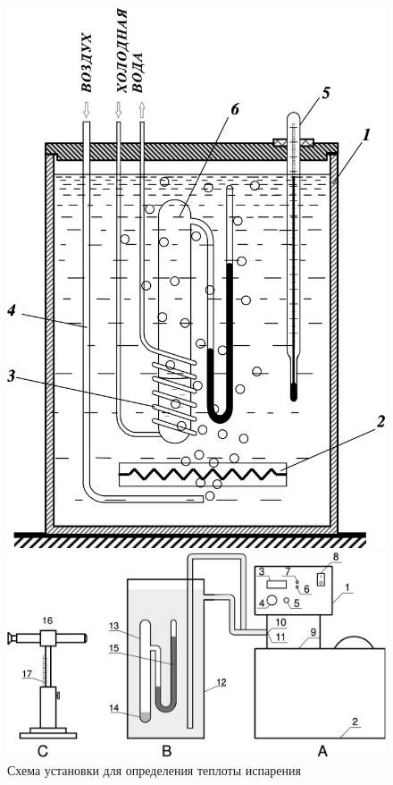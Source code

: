 \documentclass[a4paper, 12pt]{article}
\begin{document}
    \begin{figure}[ht]
        \captionsetup{justification=centering}
        \begin{center}
            \begin{minipage}[ht]{0.29\linewidth}
                \includegraphics[width=1\linewidth]{images/ust1.png}
                \caption{Схема установки для определения теплоты испарения}
                \label{pic1}
            \end{minipage}
            \hfill
            \begin{minipage}[ht]{0.65\linewidth}
                \includegraphics[width=1\linewidth]{images/ust2.png}

\end{minipage}
\end{center}
\end{figure}
\end{document}
